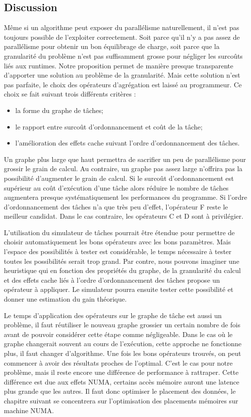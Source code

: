 \subsection{Discussion}
Même si un algorithme peut exposer du parallélisme naturellement, il n'est pas toujours possible de l'exploiter correctement.
%
Soit parce qu'il n'y a pas assez de parallélisme pour obtenir un bon équilibrage de charge, soit parce que la granularité du problème n'est pas suffisamment grosse pour négliger les surcoûts liés aux runtimes.
%
Notre proposition permet de manière presque transparente d'apporter une solution au problème de la granularité.
%
Mais cette solution n'est pas parfaite, le choix des opérateurs d'agrégation est laissé au programmeur.
%
Ce choix se fait suivant trois différents critères :
\begin{itemize}
  \item la forme du graphe de tâches;
  \item le rapport entre surcoût d'ordonnancement et coût de la tâche;
  \item l'amélioration des effets cache suivant l'ordre d'ordonnancement des tâches.
\end{itemize}
%
Un graphe plus large que haut permettra de sacrifier un peu de parallélisme pour grossir le grain de calcul.
%
Au contraire, un graphe pas assez large n'offrira pas la possibilité d'augmenter le grain de calcul.
%
Si le surcoût d'ordonnancement est supérieur au coût d'exécution d'une tâche alors réduire le nombre de tâches augmentera presque systématiquement les performances du programme.
%
Si l'ordre d'ordonnancement des tâches n'a que très peu d'effet, l'opérateur F reste le meilleur candidat.
%
Dans le cas contraire, les opérateurs C et D sont à privilégier.

L'utilisation du simulateur de tâches pourrait être étendue pour permettre de choisir automatiquement les bons opérateurs avec les bons paramètres.
%
Mais l'espace des possibilités à tester est considérable, le temps nécessaire à tester toutes les possibilités serait trop grand.
%
Par contre, nous pouvons imaginer une heuristique qui en fonction des propriétés du graphe, de la granularité du calcul et des effets cache liés à l'ordre d'ordonnancement des tâches propose un opérateur à appliquer.
%
Le simulateur pourra ensuite tester cette possibilité et donner une estimation du gain théorique.

Le temps d'application des opérateurs sur le graphe de tâche est aussi un problème, il faut réutiliser le nouveau graphe grossier un certain nombre de fois avant de pouvoir considérer cette étape comme négligeable.
%
Dans le cas où le graphe changerait souvent au cours de l'exécution, cette approche ne fonctionne plus, il faut changer d'algorithme.
%
Une fois les bons opérateurs trouvés, on peut commencer à avoir des résultats proches de l'optimal.
%
C'est le cas pour notre problème, mais il reste encore une différence de performance à rattraper.
%
Cette différence est due aux effets NUMA, certains accès mémoire auront une latence plus grande que les autres.
%
Il faut donc optimiser le placement des données, le chapitre suivant se concentrera sur l'optimisation des placements mémoires sur machine NUMA.
